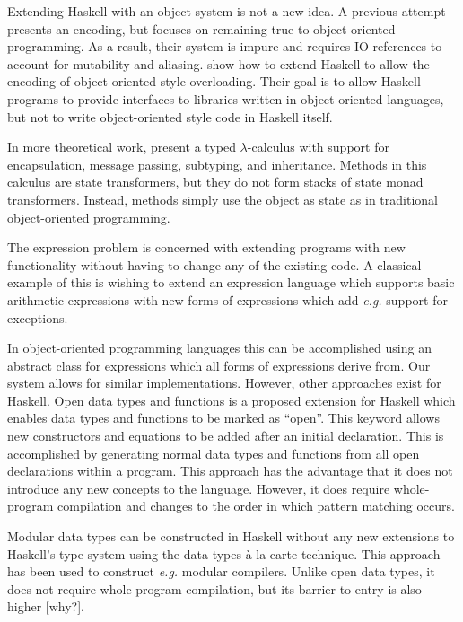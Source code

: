 \documentclass[runningheads,a4paper]{llncs}
\newcommand{\todo}[1]{[{\color{blue}#1}]}
\begin{document}
Extending Haskell with an object system is not a new idea. A previous attempt\cite{OOHaskell} presents an encoding, but focuses on remaining true to object-oriented programming. As a result, their system is impure and requires IO references to account for mutability and aliasing. \cite{shields2001object} show how to extend Haskell to allow the encoding of object-oriented style overloading. Their goal is to allow Haskell programs to provide interfaces to libraries written in object-oriented languages, but not to write object-oriented style code in Haskell itself.

In more theoretical work, \cite{Pierce93simpletype-theoretic} present a typed $\lambda$-calculus with support for encapsulation, message passing, subtyping, and inheritance. Methods in this calculus are state transformers, but they do not form stacks of state monad transformers. Instead, methods simply use the object as state as in traditional object-oriented programming.

The expression problem\cite{wadler1998expression} is concerned with extending programs with new functionality without having to change any of the existing code. A classical example of this is wishing to extend an expression language which supports basic arithmetic expressions with new forms of expressions which add \emph{e.g.} support for exceptions.  

In object-oriented programming languages this can be accomplished using an abstract class for expressions which all forms of expressions derive from. Our system allows for similar implementations. However, other approaches exist for Haskell. Open data types and functions\cite{loh2006open} is a proposed extension for Haskell which enables data types and functions to be marked as ``open''. This keyword allows new constructors and equations to be added after an initial declaration. This is accomplished by generating normal data types and functions from all open declarations within a program. This approach has the advantage that it does not introduce any new concepts to the language. However, it does require whole-program compilation and changes to the order in which pattern matching occurs.

Modular data types can be constructed in Haskell without any new extensions to Haskell's type system using the data types \`a la carte technique\cite{swierstra2008data}. This approach has been used to construct \emph{e.g.} modular compilers\cite{day2012towards}. Unlike open data types, it does not require whole-program compilation, but its barrier to entry is also higher \todo{why?}. 
\end{document}
